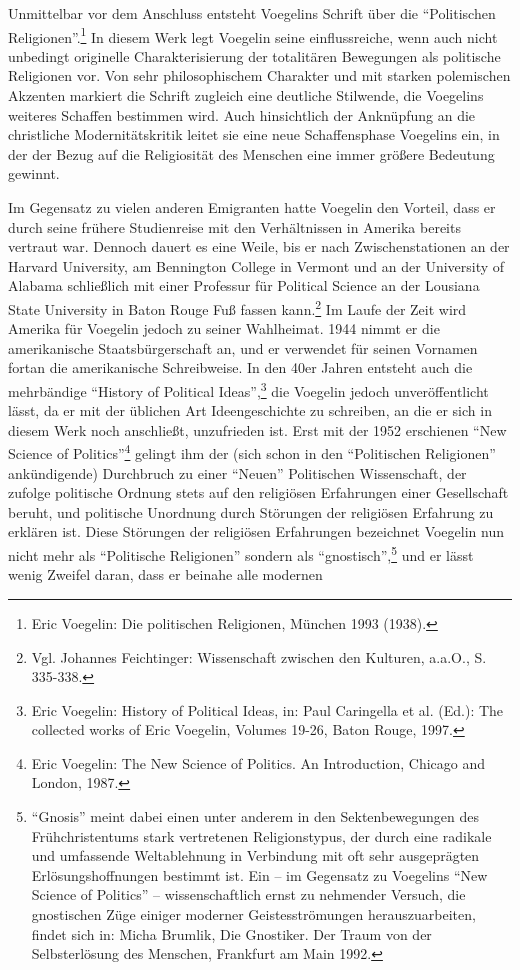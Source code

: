 \documentclass[12pt,a4paper,ngerman]{article}
\begin{document}
Unmittelbar vor dem Anschluss entsteht Voegelins Schrift über die
"`Politischen Religionen"'.\footnote{Eric Voegelin: Die politischen
  Religionen, München 1993 (1938).} In diesem Werk legt Voegelin seine
einflussreiche, wenn auch nicht unbedingt originelle Charakterisierung der
totalitären Bewegungen als politische Religionen vor. Von sehr philosophischem
Charakter und mit starken polemischen Akzenten markiert die Schrift zugleich
eine deutliche Stilwende, die Voegelins weiteres Schaffen bestimmen wird. Auch
hinsichtlich der Anknüpfung an die christliche Modernitätskritik leitet sie
eine neue Schaffensphase Voegelins ein, in der der Bezug auf die Religiosität
des Menschen eine immer größere Bedeutung gewinnt.

Im Gegensatz zu vielen anderen Emigranten hatte Voegelin den Vorteil, dass er
durch seine frühere Studienreise mit den Verhältnissen in Amerika bereits
vertraut war. Dennoch dauert es eine Weile, bis er nach Zwischenstationen an
der Harvard University, am Bennington College in Vermont und an der University
of Alabama schließlich mit einer Professur für Political Science an der
Lousiana State University in Baton Rouge Fuß fassen kann.\footnote{Vgl.
  Johannes Feichtinger: Wissenschaft zwischen den Kulturen, a.a.O., S.
  335-338.} Im Laufe der Zeit wird Amerika für Voegelin jedoch zu seiner
Wahlheimat. 1944 nimmt er die amerikanische Staatsbürgerschaft an, und er
verwendet für seinen Vornamen fortan die amerikanische Schreibweise. In den
40er Jahren entsteht auch die mehrbändige "`History of Political
Ideas"',\footnote{Eric Voegelin: History of Political Ideas, in: Paul
  Caringella et al. (Ed.): The collected works of Eric Voegelin, Volumes
  19-26, Baton Rouge, 1997.} die Voegelin jedoch unveröffentlicht lässt, da er
mit der üblichen Art Ideengeschichte zu schreiben, an die er sich in diesem
Werk noch anschließt, unzufrieden ist.  Erst mit der 1952 erschienen "`New
Science of Politics"'\footnote{Eric Voegelin: The New Science of Politics. An
  Introduction, Chicago and London, 1987.} gelingt ihm der (sich schon in den
"`Politischen Religionen"' ankündigende) Durchbruch zu einer "`Neuen"'
Politischen Wissenschaft, der zufolge politische Ordnung stets auf den
religiösen Erfahrungen einer Gesellschaft beruht, und politische Unordnung
durch Störungen der religiösen Erfahrung zu erklären ist.  Diese Störungen der
religiösen Erfahrungen bezeichnet Voegelin nun nicht mehr als "`Politische
Religionen"' sondern als "`gnostisch"',\footnote{"`Gnosis"' meint dabei einen
  unter anderem in den Sektenbewegungen des Frühchristentums stark vertretenen
  Religionstypus, der durch eine radikale und umfassende Weltablehnung in
  Verbindung mit oft sehr ausgeprägten Erlösungshoffnungen bestimmt ist. Ein
  -- im Gegensatz zu Voegelins "`New Science of Politics"' -- wissenschaftlich
  ernst zu nehmender Versuch, die gnostischen Züge einiger moderner
  Geistesströmungen herauszuarbeiten, findet sich in: Micha Brumlik, Die
  Gnostiker. Der Traum von der Selbsterlösung des Menschen, Frankfurt am Main
  1992.} und er lässt wenig Zweifel daran, dass er beinahe alle modernen
\end{document}
